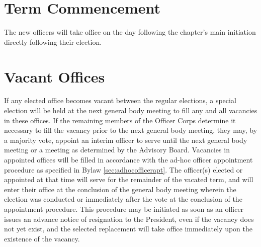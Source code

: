  
\section{Term Commencement} The new officers will take office on the day following the chapter's main initiation directly following their election.
\section{Vacant Offices} If any elected office becomes vacant between the regular elections, a special election will be held at the next general body meeting to fill any and all vacancies in these offices. If the remaining members of the Officer Corps determine it necessary to fill the vacancy prior to the next general body meeting, they may, by a majority vote, appoint an interim officer to serve until the next general body meeting or a meeting as determined by the Advisory Board. Vacancies in appointed offices will be filled in accordance with the ad-hoc officer appointment procedure as specified in Bylaw \ref{sec:adhocofficerapt}. The officer(s) elected or appointed at that time will serve for the remainder of the vacated term, and will enter their office at the conclusion of the general body meeting wherein the election was conducted or immediately after the vote at the conclusion of the appointment procedure. This procedure may be initiated as soon as an officer issues an advance notice of resignation to the President, even if the vacancy does not yet exist, and the selected replacement will take office immediately upon the existence of the vacancy. %

